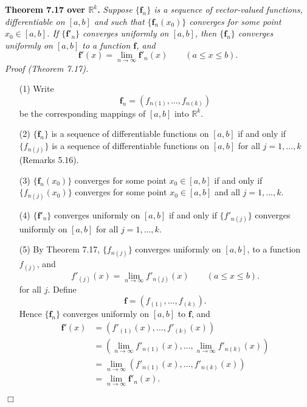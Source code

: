 \documentclass{article}
\begin{document}
\textbf{Theorem 7.17 over $\mathbb{R}^k$.}
\emph{Suppose $\{\mathbf{f}_n\}$ is a sequence of vector-valued functions,
differentiable on $[a,b]$ and such that
$\{\mathbf{f}_n(x_0)\}$ converges for some point $x_0 \in [a,b]$.
If $\{\mathbf{f}'_n\}$ converges uniformly on $[a,b]$,
then $\{\mathbf{f}_n\}$ converges uniformly on $[a,b]$ to a function $\mathbf{f}$,
and}
\[
  \mathbf{f}'(x) = \lim_{n \to \infty} \mathbf{f}'_n(x)
  \qquad
  (a \leq x \leq b).
\]
\emph{Proof (Theorem 7.17).}
\begin{enumerate}
\item[(1)]
  Write
  \[
    \mathbf{f}_n = \left(f_{n(1)}, \ldots, f_{n(k)}\right)
  \]
  be the corresponding mappings of $[a,b]$ into $\mathbb{R}^k$.

\item[(2)]
  $\{\mathbf{f}_n\}$ is a sequence of differentiable functions on $[a,b]$
  if and only if
  $\{f_{n(j)}\}$ is a sequence of differentiable functions on $[a,b]$ for all $j=1,\ldots,k$
  (Remarks 5.16).

\item[(3)]
  $\{\mathbf{f}_n(x_0)\}$ converges for some point $x_0 \in [a,b]$
  if and only if
  $\{f_{n(j)}(x_0)\}$ converges for some point $x_0 \in [a,b]$ and all $j=1,\ldots,k$.

\item[(4)]
  $\{\mathbf{f}'_n\}$ converges uniformly on $[a,b]$
  if and only if
  $\{ f'_{n(j)} \}$ converges uniformly on $[a,b]$ for all $j=1,\ldots,k$.

\item[(5)]
  By Theorem 7.17, $\{f_{n(j)}\}$ converges uniformly on $[a,b]$, to a function $f_{(j)}$,
  and
  \[
    f'_{(j)}(x) = \lim_{n \to \infty} f'_{n(j)}(x)
    \qquad
    (a \leq x \leq b).
  \]
  for all $j$.
  Define
  \[
    \mathbf{f} = \left(f_{(1)}, \ldots, f_{(k)}\right).
  \]
  Hence $\{\mathbf{f}_n\}$ converges uniformly on $[a,b]$ to $\mathbf{f}$,
  and
  \begin{align*}
    \mathbf{f}'(x)
    &= \left( f'_{(1)}(x), \ldots, f'_{(k)}(x) \right) \\
    &= \left( \lim_{n \to \infty} f'_{n(1)}(x), \ldots, \lim_{n \to \infty} f'_{n(k)}(x) \right) \\
    &= \lim_{n \to \infty} \left( f'_{n(1)}(x), \ldots, f'_{n(k)}(x) \right) \\
    &= \lim_{n \to \infty} \mathbf{f}'_n(x).
  \end{align*}
\end{enumerate}
$\Box$ \\
\end{document}
